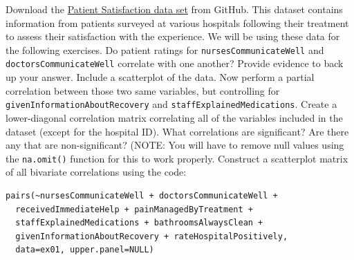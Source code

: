 \prob Download the \href{https://raw.githubusercontent.com/faulconbridge/appliedStats/master/part2/data/correlationEx01.csv}{Patient Satisfaction data set} from GitHub. This dataset contains information from patients surveyed at various hospitals following their treatment to assess their satisfaction with the experience. We will be using these data for the following exercises.
\prob Do patient ratings for \verb|nursesCommunicateWell| and \verb|doctorsCommunicateWell| correlate with one another? Provide evidence to back up your answer. Include a scatterplot of the data.
\prob Now perform a partial correlation between those two same variables, but controlling for\\\verb|givenInformationAboutRecovery| and \verb|staffExplainedMedications|.
\prob Create a lower-diagonal correlation matrix correlating all of the variables included in the dataset (except for the hospital ID). What correlations are significant? Are there any that are non-significant? (NOTE: You will have to remove null values using the \verb|na.omit()| function for this to work properly.
\prob Construct a scatterplot matrix of all bivariate correlations using the code:
\begin{framed}
\begin{Verbatim}[samepage=TRUE]
pairs(~nursesCommunicateWell + doctorsCommunicateWell +
  receivedImmediateHelp + painManagedByTreatment +
  staffExplainedMedications + bathroomsAlwaysClean +
  givenInformationAboutRecovery + rateHospitalPositively,
  data=ex01, upper.panel=NULL)
\end{Verbatim}
\end{framed}
  
